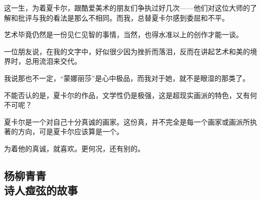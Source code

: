 \par 这一生，为着夏卡尔，跟酷爱美术的朋友们争执过好几次——他们对这位大师的了解和批评与我的看法是那么不相同。而我，总替夏卡尔感到委屈和不平。
\par 艺术毕竟仍然是一份见仁见智的事情，当然，也得水准以上的创作才能一谈。
\par 一位朋友说，在我的文字中，好似很少因为挫折而落泪，反而在讲起艺术和美的境界时，总用流泪来交代。
\par 我说那也不一定，“蒙娜丽莎”是心中极品，而我对于她，就不是眼湿的那类了。
\par 不能否认的是，夏卡尔的作品，文学性仍是极强，这是超现实画派的特色，又有何不可呢？
\par 夏卡尔是一个对自己十分真诚的画家。这份真，并不完全是每一个画家或画派所执著的方向，可是夏卡尔应该算是一个。
\par 为着他的真诚，就喜欢。更何况，还有别的。


\subsection{杨柳青青\\\small{诗人痖弦的故事}}



